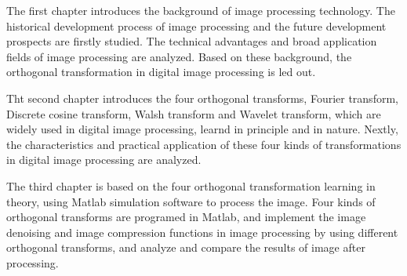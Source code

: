 The first chapter introduces the background of image processing technology. The historical development process of image processing and the future development prospects are firstly studied. The technical advantages and broad application fields of image processing are analyzed. Based on these background, the orthogonal transformation in digital image processing is led out.

Tht second chapter introduces the four orthogonal transforms, Fourier transform, Discrete cosine transform, Walsh transform and Wavelet transform, which are widely used in digital image processing, learnd in principle and in nature. Nextly, the characteristics and practical application of these four kinds of transformations in digital image processing are analyzed.

The third chapter is based on the four orthogonal transformation learning in  theory, using Matlab simulation software to process the image. Four kinds of orthogonal transforms are programed in Matlab, and implement the image denoising and image compression functions in image processing by using different orthogonal transforms, and analyze and compare the results of image after processing.


